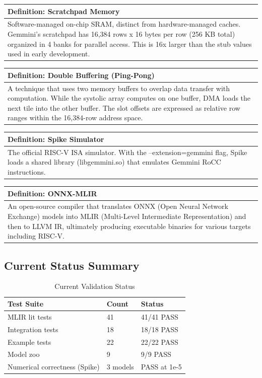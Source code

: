 \documentclass[12pt,a4paper]{article}
\newenvironment{definition}[2][Definition]{
    \begin{center}
    \begin{tabular}{|p{0.95\textwidth}|}
    \hline
    \textbf{#1: #2} \\
    \hline
    \begin{minipage}{0.93\textwidth}
}{
    \end{minipage} \\
    \hline
    \end{tabular}
    \end{center}
}
\begin{document}
\begin{definition}{Scratchpad Memory}
Software-managed on-chip SRAM, distinct from hardware-managed caches. Gemmini's scratchpad has 16,384 rows x 16 bytes per row (256 KB total) organized in 4 banks for parallel access. This is 16x larger than the stub values used in early development.
\end{definition}

\begin{definition}{Double Buffering (Ping-Pong)}
A technique that uses two memory buffers to overlap data transfer with computation. While the systolic array computes on one buffer, DMA loads the next tile into the other buffer. The slot offsets are expressed as relative row ranges within the 16,384-row address space.
\end{definition}

\begin{definition}{Spike Simulator}
The official RISC-V ISA simulator. With the --extension=gemmini flag, Spike loads a shared library (libgemmini.so) that emulates Gemmini RoCC instructions.
\end{definition}

\begin{definition}{ONNX-MLIR}
An open-source compiler that translates ONNX (Open Neural Network Exchange) models into MLIR (Multi-Level Intermediate Representation) and then to LLVM IR, ultimately producing executable binaries for various targets including RISC-V.
\end{definition}

\subsection{Current Status Summary}

\begin{table}[H]
\centering
\begin{tabular}{|p{}|p{}|p{}|}
\hline
\textbf{Test Suite} & \textbf{Count} & \textbf{Status} \\
\hline
MLIR lit tests & 41 & \textcolor{passgreen}{41/41 PASS} \\
\hline
Integration tests & 18 & \textcolor{passgreen}{18/18 PASS} \\
\hline
Example tests & 22 & \textcolor{passgreen}{22/22 PASS} \\
\hline
Model zoo & 9 & \textcolor{passgreen}{9/9 PASS} \\
\hline
Numerical correctness (Spike) & 3 models & \textcolor{passgreen}{PASS at 1e-5} \\
\hline
\end{tabular}
\caption{Current Validation Status}
\end{table}
\end{document}
